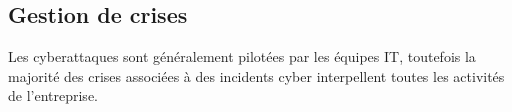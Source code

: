 %
%

\subsection{Gestion de crises}


Les cyberattaques sont généralement pilotées par les équipes IT, toutefois la majorité des crises associées à des incidents cyber interpellent toutes les activités de l'entreprise.   
%
%
%

